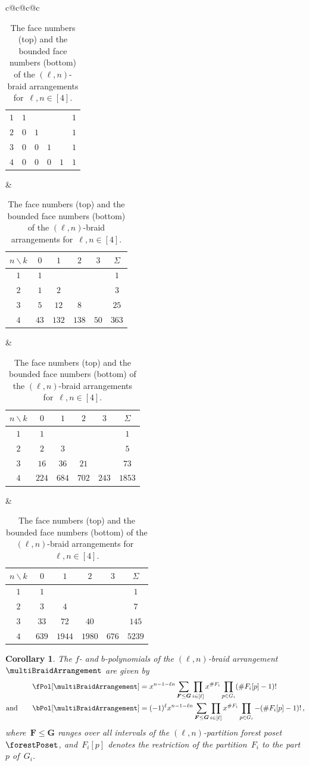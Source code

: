 \documentclass{amsart}
\newtheorem{corollary}[theorem]{Corollary}
\theoremstyle{definition}
\renewcommand{\b}[1]{{\boldsymbol{#1}}} %
\renewcommand{\b}[1]{\boldsymbol{#1}} %
\begin{document}
\begin{table}
{{\begin{tabular}{c@{\hspace{.7cm}}c@{\hspace{.7cm}}c@{\hspace{.7cm}}c}
\begin{tabular}[t]{c|cccc|c}
				\hline
				$1$ & $1$ &&&& $1$ \\
				$2$ & $0$ & $1$ &&& $1$ \\
				$3$ & $0$ & $0$ & $1$ && $1$ \\
				$4$ & $0$ & $0$ & $0$ & $1$ & $1$
			\end{tabular}
			&
			\begin{tabular}[t]{c|cccc|c}
				$n \backslash k$ & $0$ & $1$ & $2$ & $3$ & $\Sigma$ \\
				\hline
				$1$ & $1$ &&&& $1$ \\
				$2$ & $1$ & $2$ &&& $3$ \\
				$3$ & $5$ & $12$ & $8$ && $25$ \\
				$4$ & $43$ & $132$ & $138$ & $50$ & $363$
			\end{tabular}
			&
			\begin{tabular}[t]{c|cccc|c}
				$n \backslash k$ & $0$ & $1$ & $2$ & $3$ & $\Sigma$ \\
				\hline
				$1$ & $1$ &&&& $1$ \\
				$2$ & $2$ & $3$ &&& $5$ \\
				$3$ & $16$ & $36$ & $21$ && $73$ \\
				$4$ & $224$ & $684$ & $702$ & $243$ & $1853$
			\end{tabular}
			&
			\begin{tabular}[t]{c|cccc|c}
				$n \backslash k$ & $0$ & $1$ & $2$ & $3$ & $\Sigma$ \\
				\hline
				$1$ & $1$ &&&& $1$ \\
				$2$ & $3$ & $4$ &&& $7$ \\
				$3$ & $33$ & $72$ & $40$ && $145$ \\
				$4$ & $639$ & $1944$ & $1980$ & $676$ & $5239$
			\end{tabular}
		\end{tabular}
	}}
	\vspace{.3cm}
	\caption{The face numbers (top) and the bounded face numbers (bottom) of the $(\ell,n)$-braid arrangements for~$\ell, n \in [4]$.}
	\label{table:fvectorMultiBraidArrangements}
\end{table}

\begin{corollary}
\label{coro:fbvectorsMultiBraidArrangement}
The $f$- and $b$-polynomials of the $(\ell,n)$-braid arrangement~$\multiBraidArrangement$ are given by
\begin{align*}
\fPol[\multiBraidArrangement] & = x^{n-1-\ell n}\sum_{\b{F} \le \b{G}} \prod_{i \in [\ell]} x^{\#F_i} \prod_{p \in G_i} (\# F_i[p]-1)!\\
\text{and}\qquad
\bPol[\multiBraidArrangement] & = (-1)^\ell x^{n-1-\ell n} \sum_{\b{F} \le \b{G}} \prod_{i \in [\ell]} x^{\#F_i} \prod_{p \in G_i} -(\# F_i[p]-1)! \, ,
\end{align*}
where~$\b{F} \le \b{G}$ ranges over all intervals of the $(\ell,n)$-partition forest poset~$\forestPoset$, and~$F_i[p]$ denotes the restriction of the partition~$F_i$ to the part~$p$ of~$G_i$.
\end{corollary}
\end{document}
